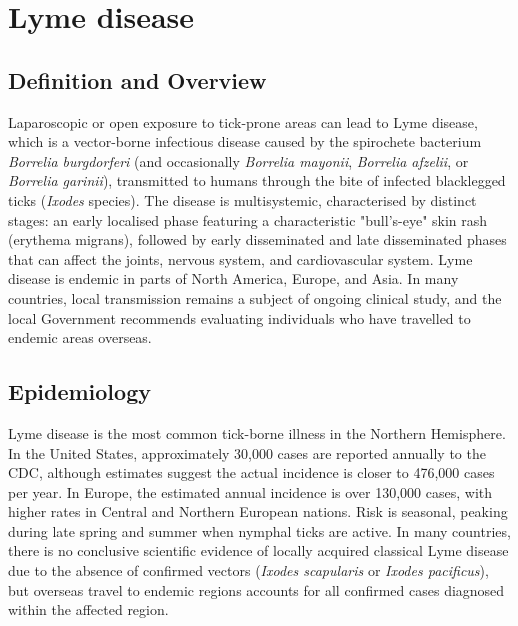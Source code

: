 \chapter{Lyme disease}

\section*{Definition and Overview}
Laparoscopic or open exposure to tick-prone areas can lead to Lyme disease, which is a vector-borne infectious disease caused by the spirochete bacterium \textit{Borrelia burgdorferi} (and occasionally \textit{Borrelia mayonii}, \textit{Borrelia afzelii}, or \textit{Borrelia garinii}), transmitted to humans through the bite of infected blacklegged ticks (\textit{Ixodes} species). The disease is multisystemic, characterised by distinct stages: an early localised phase featuring a characteristic "bull's-eye" skin rash (erythema migrans), followed by early disseminated and late disseminated phases that can affect the joints, nervous system, and cardiovascular system. Lyme disease is endemic in parts of North America, Europe, and Asia. In many countries, local transmission remains a subject of ongoing clinical study, and the local Government recommends evaluating individuals who have travelled to endemic areas overseas.

\section*{Epidemiology}
Lyme disease is the most common tick-borne illness in the Northern Hemisphere. In the United States, approximately 30,000 cases are reported annually to the CDC, although estimates suggest the actual incidence is closer to 476,000 cases per year. In Europe, the estimated annual incidence is over 130,000 cases, with higher rates in Central and Northern European nations. Risk is seasonal, peaking during late spring and summer when nymphal ticks are active. In many countries, there is no conclusive scientific evidence of locally acquired classical Lyme disease due to the absence of confirmed vectors (\textit{Ixodes scapularis} or \textit{Ixodes pacificus}), but overseas travel to endemic regions accounts for all confirmed cases diagnosed within the affected region.

